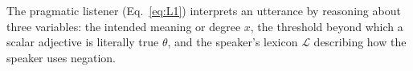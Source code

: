 \documentclass[floatsintext,doc]{apa6}
\begin{document}
The pragmatic listener (Eq.~\ref{eq:L1}) interprets an utterance by reasoning about three variables: the intended meaning or degree $x$, the threshold beyond which a scalar adjective is literally true  $\theta$, and the speaker's lexicon \(\mathcal{L}\) describing how the speaker uses negation. 


\end{document}
